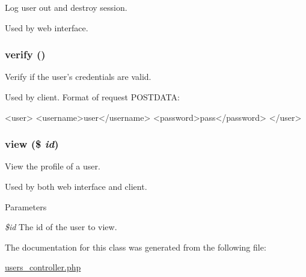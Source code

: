 Log user out and destroy session. 

Used by web interface. \hypertarget{class_users_controller_aa33600b6a1b28d0c4dfe4d468272aaa4}{
\subsubsection[{verify}]{\setlength{\rightskip}{0pt plus 5cm}verify ()}}
\label{class_users_controller_aa33600b6a1b28d0c4dfe4d468272aaa4}


Verify if the user's credentials are valid. 

Used by client. Format of request POSTDATA: 
\begin{DoxyCode}
 <user>
   <username>user</username>
   <password>pass</password>
 </user>
\end{DoxyCode}
 \hypertarget{class_users_controller_a93a99cdd06e6a3044ed7e56db0f9419a}{
\subsubsection[{view}]{\setlength{\rightskip}{0pt plus 5cm}view (\$ {\em id})}}
\label{class_users_controller_a93a99cdd06e6a3044ed7e56db0f9419a}


View the profile of a user. 

Used by both web interface and client. 
\begin{DoxyParams}{Parameters}
\item[{\em \$id}]The id of the user to view. \end{DoxyParams}


The documentation for this class was generated from the following file:\begin{DoxyCompactItemize}
\item 
\hyperlink{users__controller_8php}{users\_\-controller.php}\end{DoxyCompactItemize}
